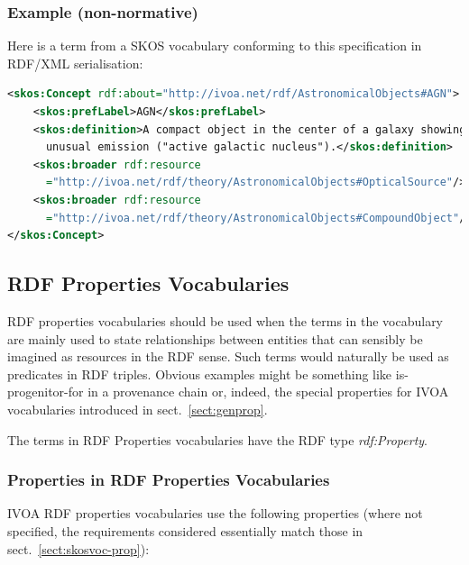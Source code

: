\documentclass[11pt,a4paper]{ivoa}
\newcommand{\vocterm}[1]{\emph{\color{termcolor}#1}}
\begin{document}
\subsubsection{Example (non-normative)}

Here is a term from a SKOS vocabulary conforming to this specification
in RDF/XML serialisation:

\begin{lstlisting}[language=XML]
<skos:Concept rdf:about="http://ivoa.net/rdf/AstronomicalObjects#AGN">
	<skos:prefLabel>AGN</skos:prefLabel>
	<skos:definition>A compact object in the center of a galaxy showing 
	  unusual emission ("active galactic nucleus").</skos:definition>
	<skos:broader rdf:resource
	  ="http://ivoa.net/rdf/theory/AstronomicalObjects#OpticalSource"/>
	<skos:broader rdf:resource
	  ="http://ivoa.net/rdf/theory/AstronomicalObjects#CompoundObject"/>
</skos:Concept>
\end{lstlisting}

\subsection{RDF Properties Vocabularies}
\label{sect:refpropvoc}

RDF properties vocabularies should be used when the terms in the
vocabulary are mainly used to state
relationships between entities that can sensibly be imagined as
resources in the RDF sense.  Such terms would naturally be used as
predicates in RDF triples.  Obvious examples might be something
like is-progenitor-for in a provenance chain or, indeed, the special
properties for IVOA vocabularies introduced in sect.~\ref{sect:genprop}.


The terms in RDF Properties vocabularies have the RDF type 
\vocterm{rdf:Property}.

\subsubsection{Properties in RDF Properties Vocabularies}
\label{sect:propvoc-prop}

IVOA RDF properties vocabularies use the following properties (where
not specified, the requirements considered essentially match those in
sect.~\ref{sect:skosvoc-prop}):
\end{document}
